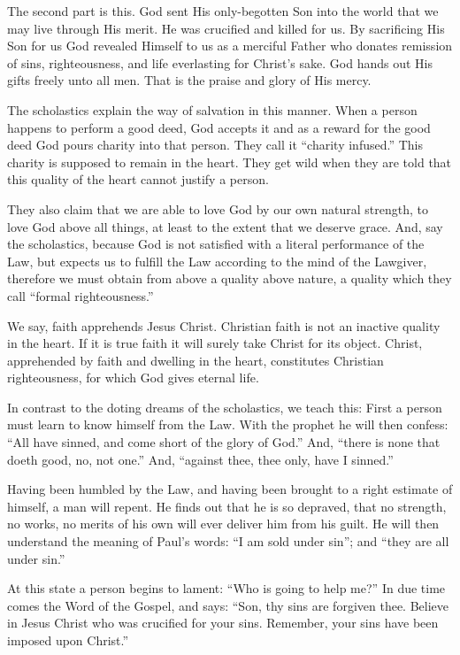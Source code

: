 The second part is this. God sent His only-begotten Son into the world that we may live through His merit. He was crucified and killed for us. By sacrificing His Son for us God revealed Himself to us as a merciful Father who donates remission of sins, righteousness, and life everlasting for Christ’s sake. God hands out His gifts freely unto all men. That is the praise and glory of His mercy.

The scholastics explain the way of salvation in this manner. When a person happens to perform a good deed, God accepts it and as a reward for the good deed God pours charity into that person. They call it “charity infused.” This charity is supposed to remain in the heart. They get wild when they are told that this quality of the heart cannot justify a person.

They also claim that we are able to love God by our own natural strength, to love God above all things, at least to the extent that we deserve grace. And, say the scholastics, because God is not satisfied with a literal performance of the Law, but expects us to fulfill the Law according to the mind of the Lawgiver, therefore we must obtain from above a quality above nature, a quality which they call “formal righteousness.”

We say, faith apprehends Jesus Christ. Christian faith is not an inactive quality in the heart. If it is true faith it will surely take Christ for its object. Christ, apprehended by faith and dwelling in the heart, constitutes Christian righteousness, for which God gives eternal life.

In contrast to the doting dreams of the scholastics, we teach this: First a person must learn to know himself from the Law. With the prophet he will then confess: “All have sinned, and come short of the glory of God.” And, “there is none that doeth good, no, not one.” And, “against thee, thee only, have I sinned.”

Having been humbled by the Law, and having been brought to a right estimate of himself, a man will repent. He finds out that he is so depraved, that no strength, no works, no merits of his own will ever deliver him from his guilt. He will then understand the meaning of Paul’s words: “I am sold under sin”; and “they are all under sin.”

At this state a person begins to lament: “Who is going to help me?” In due time comes the Word of the Gospel, and says: “Son, thy sins are forgiven thee. Believe in Jesus Christ who was crucified for your sins. Remember, your sins have been imposed upon Christ.”

